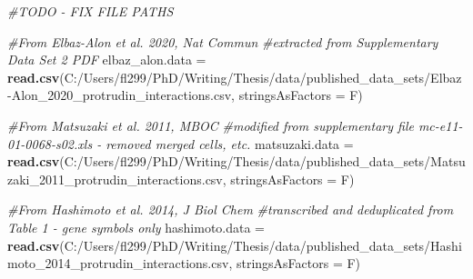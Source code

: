 \documentclass[
]{book}
\newenvironment{Shaded}{\begin{snugshade}}{\end{snugshade}}
\newcommand{\CommentTok}[1]{\textcolor[rgb]{0.56,0.35,0.01}{\textit{#1}}}
\newcommand{\DataTypeTok}[1]{\textcolor[rgb]{0.13,0.29,0.53}{#1}}
\newcommand{\KeywordTok}[1]{\textcolor[rgb]{0.13,0.29,0.53}{\textbf{#1}}}
\newcommand{\NormalTok}[1]{#1}
\newcommand{\StringTok}[1]{\textcolor[rgb]{0.31,0.60,0.02}{#1}}
\begin{document}
\begin{Shaded}
\begin{Highlighting}[]
\CommentTok{\#TODO {-} FIX FILE PATHS}

\CommentTok{\#From Elbaz{-}Alon et al. 2020, Nat Commun}
\CommentTok{\#extracted from Supplementary Data Set 2 PDF}
\NormalTok{elbaz\_alon.data =}\StringTok{ }\KeywordTok{read.csv}\NormalTok{(}\StringTok{\textquotesingle{}C:/Users/fl299/PhD/Writing/Thesis/data/published\_data\_sets/Elbaz{-}Alon\_2020\_protrudin\_interactions.csv\textquotesingle{}}\NormalTok{, }\DataTypeTok{stringsAsFactors =}\NormalTok{ F)}

\CommentTok{\#From Matsuzaki et al. 2011, MBOC}
\CommentTok{\#modified from supplementary file mc{-}e11{-}01{-}0068{-}s02.xls {-} removed merged cells, etc.}
\NormalTok{matsuzaki.data =}\StringTok{ }\KeywordTok{read.csv}\NormalTok{(}\StringTok{\textquotesingle{}C:/Users/fl299/PhD/Writing/Thesis/data/published\_data\_sets/Matsuzaki\_2011\_protrudin\_interactions.csv\textquotesingle{}}\NormalTok{, }\DataTypeTok{stringsAsFactors =}\NormalTok{ F)}

\CommentTok{\#From Hashimoto et al. 2014, J Biol Chem}
\CommentTok{\#transcribed and deduplicated from Table 1 {-} gene symbols only}
\NormalTok{hashimoto.data =}\StringTok{ }\KeywordTok{read.csv}\NormalTok{(}\StringTok{\textquotesingle{}C:/Users/fl299/PhD/Writing/Thesis/data/published\_data\_sets/Hashimoto\_2014\_protrudin\_interactions.csv\textquotesingle{}}\NormalTok{, }\DataTypeTok{stringsAsFactors =}\NormalTok{ F)}


\end{Highlighting}
\end{Shaded}
\end{document}
